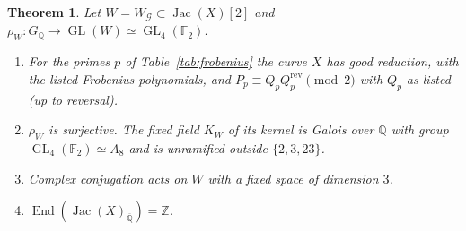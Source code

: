 \documentclass[11pt]{amsart}
\newtheorem{theorem}{Theorem}[section]
\theoremstyle{definition}
\newcommand{\QQ}{\mathbb{Q}}
\newcommand{\ZZ}{\mathbb{Z}}
\newcommand{\FF}{\mathbb{F}}
\newcommand{\Qbar}{\overline{\QQ}}
\newcommand{\End}{\operatorname{End}}
\newcommand{\Jac}{\operatorname{Jac}}
\newcommand{\GL}{\operatorname{GL}}
\newcommand{\rev}{\mathrm{rev}}
\newcommand{\cG}{\mathcal{G}}
\newcommand{\GQ}{G_{\QQ}}
\begin{document}


\begin{theorem}\label{thm:image}
Let $W=W_\cG\subset\Jac(X)[2]$ and $\rho_W\colon\GQ\to\GL(W)\simeq\GL_4(\FF_2)$.
\begin{enumerate}[label=\textup{(\roman*)}]
\item For the primes $p$ of Table~\ref{tab:frobenius} the curve $X$ has good reduction, with the listed Frobenius polynomials, and $P_p\equiv Q_pQ_p^{\rev}\pmod2$ with $Q_p$ as listed (up to reversal).
\item $\rho_W$ is surjective. The fixed field $K_W$ of its kernel is Galois over $\QQ$ with group $\GL_4(\FF_2)\simeq A_8$ and is unramified outside $\{2,3,23\}$.
\item Complex conjugation acts on $W$ with a fixed space of dimension $3$.
\item $\End(\Jac(X)_{\Qbar})=\ZZ$.
\end{enumerate}
\end{theorem}
\end{document}

